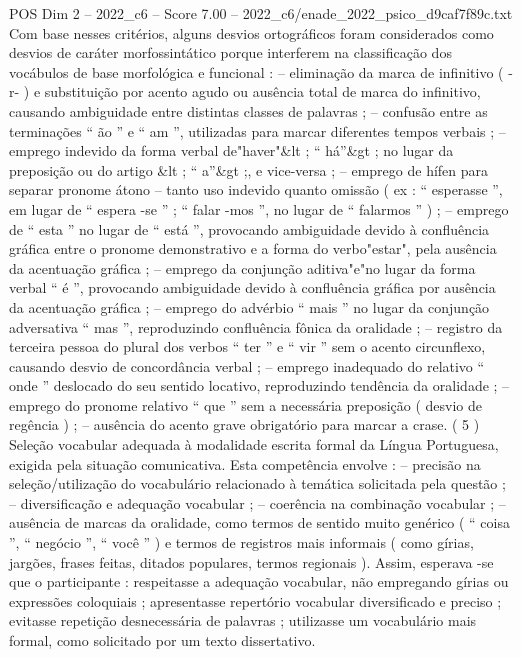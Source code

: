 \begin{textsample}{POS Dim 2 – 2022\_c6 – Score 7.00 – 2022\_c6/enade\_2022\_psico\_d9caf7f89c.txt}
Com base nesses critérios, alguns desvios ortográficos foram considerados como desvios de caráter morfossintático porque interferem na classificação dos vocábulos de base morfológica e funcional : – eliminação da marca de infinitivo ( -r- ) e substituição por acento agudo ou ausência total de marca do infinitivo, causando ambiguidade entre distintas classes de palavras ; – confusão entre as terminações “ ão ” e “ am ”, utilizadas para marcar diferentes tempos verbais ; – emprego indevido da forma verbal de"haver"\&lt ; “ há”\&gt ; no lugar da preposição ou do artigo \&lt ; “ a”\&gt ;, e vice-versa ; – emprego de hífen para separar pronome átono – tanto uso indevido quanto omissão ( ex : “ esperasse ”, em lugar de “ espera -se ” ; “ falar -mos ”, no lugar de “ falarmos ” ) ; – emprego de “ esta ” no lugar de “ está ”, provocando ambiguidade devido à confluência gráfica entre o pronome demonstrativo e a forma do verbo"estar", pela ausência da acentuação gráfica ; – emprego da conjunção aditiva"e"no lugar da forma verbal “ é ”, provocando ambiguidade devido à confluência gráfica por ausência da acentuação gráfica ; – emprego do advérbio “ mais ” no lugar da conjunção adversativa “ mas ”, reproduzindo confluência fônica da oralidade ; – registro da terceira pessoa do plural dos verbos “ ter ” e “ vir ” sem o acento circunflexo, causando desvio de concordância verbal ; – emprego inadequado do relativo “ onde ” deslocado do seu sentido locativo, reproduzindo tendência da oralidade ; – emprego do pronome relativo “ que ” sem a necessária preposição ( desvio de regência ) ; – ausência do acento grave obrigatório para marcar a crase. ( 5 ) Seleção vocabular adequada à modalidade escrita formal da Língua Portuguesa, exigida pela situação comunicativa.
Esta competência envolve : – precisão na seleção/utilização do vocabulário relacionado à temática solicitada pela questão ; – diversificação e adequação vocabular ; – coerência na combinação vocabular ; – ausência de marcas da oralidade, como termos de sentido muito genérico ( “ coisa ”, “ negócio ”, “ você ” ) e termos de registros mais informais ( como gírias, jargões, frases feitas, ditados populares, termos regionais ).
Assim, esperava -se que o participante : respeitasse a adequação vocabular, não empregando gírias ou expressões coloquiais ; apresentasse repertório vocabular diversificado e preciso ; evitasse repetição desnecessária de palavras ; utilizasse um vocabulário mais formal, como solicitado por um texto dissertativo.

\end{textsample}
